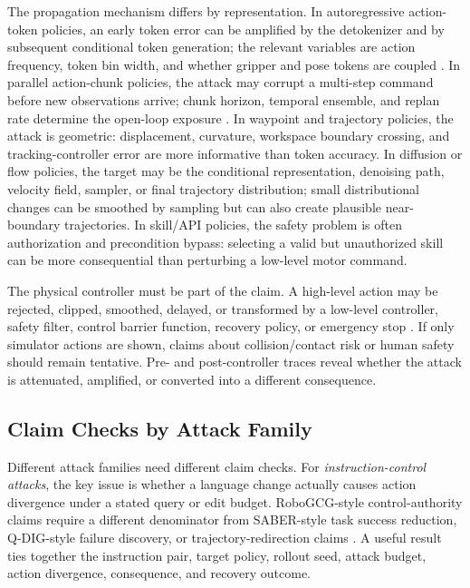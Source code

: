 The propagation mechanism differs by representation. In autoregressive action-token policies, an early token error can be amplified by the detokenizer and by subsequent conditional token generation; the relevant variables are action frequency, token bin width, and whether gripper and pose tokens are coupled \cite{shafiullah2022bet,lee2024vqbet,pertsch2025fast}. In parallel action-chunk policies, the attack may corrupt a multi-step command before new observations arrive; chunk horizon, temporal ensemble, and replan rate determine the open-loop exposure \cite{zhao2023act,kim2025openvlaoft,xu2026silentdrift}. In waypoint and trajectory policies, the attack is geometric: displacement, curvature, workspace boundary crossing, and tracking-controller error are more informative than token accuracy. In diffusion or flow policies, the target may be the conditional representation, denoising path, velocity field, sampler, or final trajectory distribution; small distributional changes can be smoothed by sampling but can also create plausible near-boundary trajectories. In skill/API policies, the safety problem is often authorization and precondition bypass: selecting a valid but unauthorized skill can be more consequential than perturbing a low-level motor command.

The physical controller must be part of the claim. A high-level action may be rejected, clipped, smoothed, delayed, or transformed by a low-level controller, safety filter, control barrier function, recovery policy, or emergency stop \cite{ames2017control,alshiekh2018shielded,achiam2017constrained,dawson2023safecontrol}. If only simulator actions are shown, claims about collision/contact risk or human safety should remain tentative. Pre- and post-controller traces reveal whether the attack is attenuated, amplified, or converted into a different consequence.

\subsection{Claim Checks by Attack Family}

Different attack families need different claim checks. For \emph{instruction-control attacks}, the key issue is whether a language change actually causes action divergence under a stated query or edit budget. RoboGCG-style control-authority claims require a different denominator from SABER-style task success reduction, Q-DIG-style failure discovery, or trajectory-redirection claims \cite{jones2025robogcg,wu2026saber,srikanth2026qdig,puthumanaillam2026trajectory}. A useful result ties together the instruction pair, target policy, rollout seed, attack budget, action divergence, consequence, and recovery outcome.

